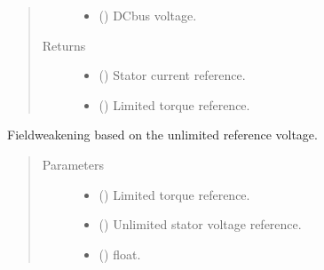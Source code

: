 \documentclass[letterpaper,10pt,english]{sphinxmanual}
\begin{document}
\begin{fulllineitems}
\begin{fulllineitems}
\begin{quote}
\begin{description}
\begin{itemize}
\item {} 
\sphinxAtStartPar
{} () \textendash{} DC\sphinxhyphen{}bus voltage.

\end{itemize}

\item[{Returns}] \leavevmode
\sphinxAtStartPar
\begin{itemize}
\item {} 
\sphinxAtStartPar
{} () \textendash{} Stator current reference.

\item {} 
\sphinxAtStartPar
{} () \textendash{} Limited torque reference.

\end{itemize}


\end{description}\end{quote}

\end{fulllineitems}


\begin{fulllineitems}
\label{\detokenize{control.sm:control.sm.vector.CurrentRef.update}}
\pysigstartsignatures
{}
\pysigstopsignatures
\sphinxAtStartPar
Field\sphinxhyphen{}weakening based on the unlimited reference voltage.
\begin{quote}\begin{description}
\item[{Parameters}] \leavevmode\begin{itemize}
\item {} 
\sphinxAtStartPar
{} () \textendash{} Limited torque reference.

\item {} 
\sphinxAtStartPar
{} () \textendash{} Unlimited stator voltage reference.

\item {} 
\sphinxAtStartPar
{} () \textendash{} float.

\end{itemize}

\end{description}\end{quote}

\end{fulllineitems}


\end{fulllineitems}
\end{document}
